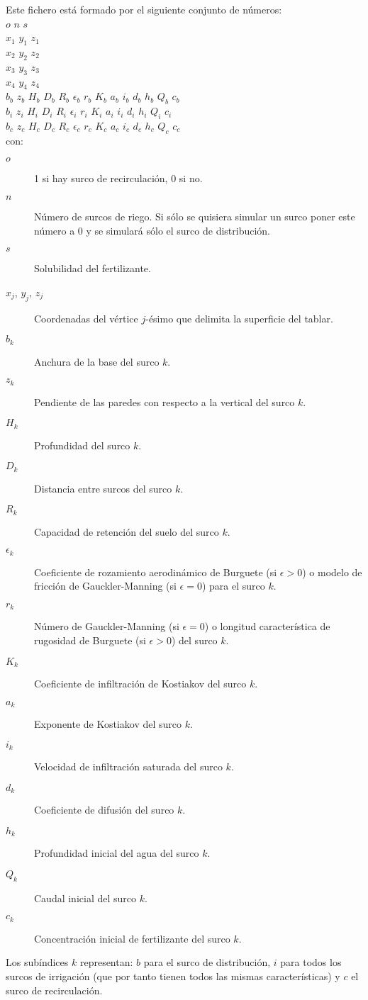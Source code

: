 Este fichero está formado por el siguiente conjunto de números:\\
$o$ $n$ $s$\\
$x_1$ $y_1$ $z_1$\\
$x_2$ $y_2$ $z_2$\\
$x_3$ $y_3$ $z_3$\\
$x_4$ $y_4$ $z_4$\\
$b_b$ $z_b$ $H_b$ $D_b$ $R_b$ $\epsilon_b$ $r_b$ $K_b$ $a_b$ $i_b$ $d_b$
	$h_b$ $Q_b$ $c_b$\\
$b_i$ $z_i$ $H_i$ $D_i$ $R_i$ $\epsilon_i$ $r_i$ $K_i$ $a_i$ $i_i$ $d_i$
	$h_i$ $Q_i$ $c_i$\\
$b_c$ $z_c$ $H_c$ $D_c$ $R_c$ $\epsilon_c$ $r_c$ $K_c$ $a_c$ $i_c$ $d_c$
	$h_c$ $Q_c$ $c_c$\\
con:
\begin{description}
\item[$o$] 1 si hay surco de recirculación, 0 si no.
\item[$n$] Número de surcos de riego. Si sólo se quisiera simular un surco poner
	este número a 0 y se simulará sólo el surco de distribución.
\item[$s$] Solubilidad del fertilizante.
\item[$x_j$, $y_j$, $z_j$] Coordenadas del vértice $j$-ésimo que delimita la
	superficie del tablar.
\item[$b_k$] Anchura de la base del surco $k$.
\item[$z_k$] Pendiente de las paredes con respecto a la vertical del surco $k$.
\item[$H_k$] Profundidad del surco $k$.
\item[$D_k$] Distancia entre surcos del surco $k$.
\item[$R_k$] Capacidad de retención del suelo del surco $k$.
\item[$\epsilon_k$] Coeficiente de rozamiento aerodinámico de Burguete (si
	$\epsilon>0$) o modelo de fricción de Gauckler-Manning (si $\epsilon=0$)
	para el surco $k$.
\item[$r_k$] Número de Gauckler-Manning (si $\epsilon=0$) o longitud
	característica de rugosidad de Burguete (si $\epsilon>0$) del surco $k$.
\item[$K_k$] Coeficiente de infiltración de Kostiakov del surco $k$.
\item[$a_k$] Exponente de Kostiakov del surco $k$.
\item[$i_k$] Velocidad de infiltración saturada del surco $k$.
\item[$d_k$] Coeficiente de difusión del surco $k$.
\item[$h_k$] Profundidad inicial del agua del surco $k$.
\item[$Q_k$] Caudal inicial del surco $k$.
\item[$c_k$] Concentración inicial de fertilizante del surco $k$.
\end{description}
Los subíndices $k$ representan: $b$ para el surco de distribución, $i$ para
todos los surcos de irrigación (que por tanto tienen todos las mismas
características) y $c$ el surco de recirculación.

